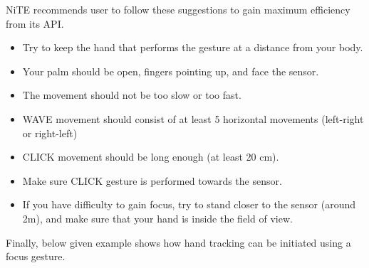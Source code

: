 NiTE recommends user to follow these suggestions to gain maximum efficiency from its API. 
\begin{itemize}
	\item Try to keep the hand that performs the gesture at a distance from your body. 
	\item Your palm should be open, fingers pointing up, and face the sensor. 
	\item The movement should not be too slow or too fast. 
	\item WAVE movement should consist of at least 5 horizontal movements (left-right or right-left) 
	\item CLICK movement should be long enough (at least 20 cm). 
	\item Make sure CLICK gesture is performed towards the sensor. 
	\item If you have difficulty to gain focus, try to stand closer to the sensor (around 2m), and make sure that your hand is inside the field of view. 
\end{itemize}

Finally, below given example shows how hand tracking can be initiated using a focus gesture. 
